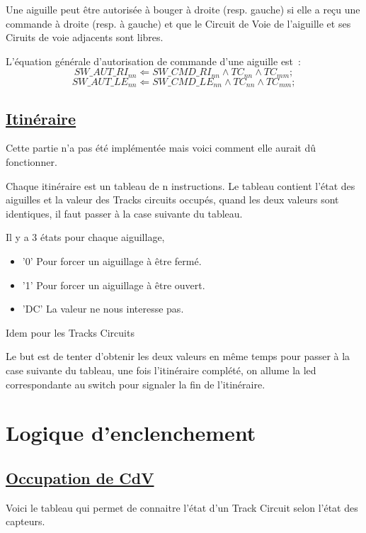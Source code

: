 Une aiguille peut être autorisée à bouger à droite (resp. gauche) 
si elle a reçu une commande à droite (resp. à gauche) et que le 
Circuit de Voie de l'aiguille et ses Ciruits de voie adjacents
sont libres. 

\medskip
L'équation générale d'autorisation de commande d'une aiguille est~:
$$\boxed{
  SW\_AUT\_RI_{nn} \Leftarrow SW\_CMD\_RI_{nn} \land TC_{nn} \land
  TC_{mm} ;
}$$
$$\boxed{
  SW\_AUT\_LE_{nn} \Leftarrow SW\_CMD\_LE_{nn} \land TC_{nn} \land TC_{mm} ;
}$$


\subsection{\underline{Itinéraire}}
\label{sec:iti}

Cette partie n'a pas été implémentée mais voici comment elle aurait dû
fonctionner.

Chaque itinéraire est un tableau de n instructions.
Le tableau contient l’état des aiguilles et la valeur des Tracks
circuits  occupés, quand les deux  valeurs sont identiques, il faut
passer  à la case suivante du  tableau.

Il y a 3 états pour chaque aiguillage,
\begin{itemize}
  \item '0' Pour forcer un aiguillage à être fermé.
  \item '1' Pour forcer un aiguillage à être ouvert.
  \item 'DC' La valeur ne nous interesse pas.    
\end{itemize}  

Idem pour les Tracks Circuits

Le but est de tenter d’obtenir les deux valeurs en même temps pour
passer à la case suivante du tableau, une fois l’itinéraire complété,
on  allume la led correspondante au switch pour signaler la fin de
l’itinéraire. 



\section{Logique d'enclenchement}
\label{sec:logic}
\subsection{\underline{Occupation de CdV}}
\label{sec:cdv_occ}

Voici le tableau qui permet de connaitre l'état d'un Track Circuit
selon l'état des capteurs.

